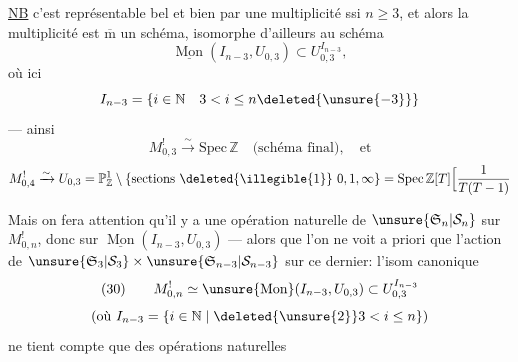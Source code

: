 
\uline{NB} c'est représentable bel et bien par une multiplicité ssi $n\geq3$,  et alors la multiplicité est $\overline{\mathrm m}$ un schéma, isomorphe d'ailleurs  au schéma
\[
\underline{\operatorname{Mon}}(I_{n-3},U_{0,3})\subset U_{0,3}^{I_{n-3}},
\]
où ici
\[
I_{n-3}=\{i\in\mathbb N\quad3<i\leq n\deleted{\unsure{-3}}\}
\]
--- ainsi 
\[
M_{0,3}^{!}\xrightarrow{\sim}\mathrm{Spec}\,\mathbb Z\quad\text{(schéma final)},\quad\text{et}
\]
\[
M_{0,4}^{!}\xrightarrow{\sim}U_{0,3}=\mathbb P^1_{\mathbb Z}\setminus\{\text{sections \deleted{\illegible{1}} }0,1,\infty\}=\mathrm{Spec}\,\mathbb Z[T]\Bigl[\frac{1}{T(T-1)}
\]

Mais on fera attention qu'il y a une opération naturelle de $\unsure{\mathfrak S_n|\mathcal S_n}$ sur $M_{0,n}^{!}$, donc sur $\underline{\operatorname{Mon}}(I_{n-3},U_{0,3})$ ---  alors que l'on ne voit a priori que l'action de $\unsure{\mathfrak S_3|\mathcal S_3}\times\unsure{\mathfrak S_{n-3}|\mathcal S_{n-3}}$ sur ce dernier: l'isom canonique
\[
(30)\qquad M_{0,n}^{!}\simeq\unsure{\operatorname{Mon}}(I_{n-3},U_{0,3})\subset U_{0,3}^{I_{n-3}}
\]
\[
\text{(où }I_{n-3}=\{i\in\mathbb N\mid\deleted{\unsure{2}}3<i\leq n\}\text{)}
\]
ne tient compte que des opérations naturelles 
